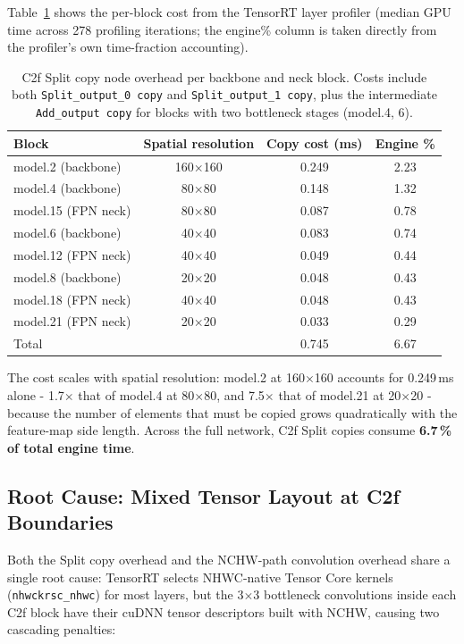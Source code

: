 \documentclass[12pt,a4paper]{report}
\begin{document}
Table~\ref{tab:split_copies} shows the per-block cost from the TensorRT layer profiler
(median GPU time across 278 profiling iterations; the engine\% column is taken directly from
the profiler's own time-fraction accounting).

\begin{table}[h]
\centering
\caption{C2f Split copy node overhead per backbone and neck block.
Costs include both \texttt{Split\_output\_0 copy} and \texttt{Split\_output\_1 copy},
plus the intermediate \texttt{Add\_output copy} for blocks with two bottleneck stages (model.4, 6).}
\label{tab:split_copies}
\begin{tabular}{lccc}
\toprule
Block & Spatial resolution & Copy cost (ms) & Engine \% \\
\midrule
model.2  (backbone) & 160$\times$160 & 0.249 & 2.23 \\
model.4  (backbone) & 80$\times$80   & 0.148 & 1.32 \\
model.15 (FPN neck) & 80$\times$80   & 0.087 & 0.78 \\
model.6  (backbone) & 40$\times$40   & 0.083 & 0.74 \\
model.12 (FPN neck) & 40$\times$40   & 0.049 & 0.44 \\
model.8  (backbone) & 20$\times$20   & 0.048 & 0.43 \\
model.18 (FPN neck) & 40$\times$40   & 0.048 & 0.43 \\
model.21 (FPN neck) & 20$\times$20   & 0.033 & 0.29 \\
\midrule
Total               &                & 0.745 & 6.67 \\
\bottomrule
\end{tabular}
\end{table}

\noindent The cost scales with spatial resolution: model.2 at 160$\times$160 accounts for 0.249\,ms
alone - 1.7$\times$ that of model.4 at 80$\times$80, and 7.5$\times$ that of model.21 at
20$\times$20 - because the number of elements that must be copied grows quadratically with the
feature-map side length.
Across the full network, C2f Split copies consume \textbf{6.7\,\% of total engine time}.

\subsection{Root Cause: Mixed Tensor Layout at C2f Boundaries}

Both the Split copy overhead and the NCHW-path convolution overhead share a single root cause:
TensorRT selects NHWC-native Tensor Core kernels (\texttt{nhwckrsc\_nhwc}) for most layers, but the
3$\times$3 bottleneck convolutions inside each C2f block have their cuDNN tensor descriptors built
with NCHW, causing two cascading penalties:
\end{document}
